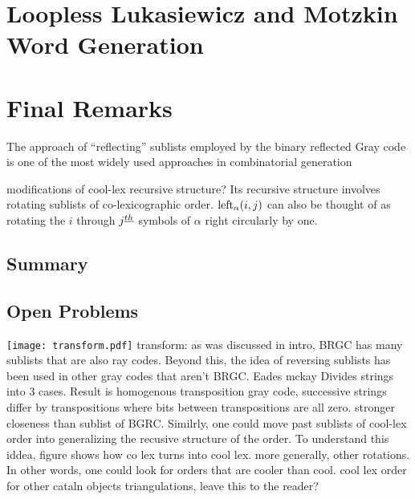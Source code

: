 \chapter{Loopless Lukasiewicz and Motzkin Word Generation} \label{chap:luka-implementation}


\chapter{Final Remarks}
The approach of “reflecting” sublists employed by the binary reflected Gray code is one of the most widely used approaches in combinatorial generation

modifications of cool-lex recursive structure?
Its recursive structure involves rotating sublists of co-lexicographic order.  
$\lshiftindex[\alpha]{i}{j}$ can also be thought of as rotating the $i$ through $j\thh$ symbols of $\alpha$ right circularly by one.
\section{Summary}
\section{Open Problems}
\texttt{[image: transform.pdf]}
transform: as was discussed in intro, BRGC has many sublists that are also ray codes.  Beyond this, the idea of reversing sublists has been used in other gray codes that aren't BRGC. Eades mckay Divides strings into 3 cases. Result is homogenous transposition gray code, successive strings differ by transpositions where bits between transpositions are all zero. stronger closeness than sublist of BGRC. Similrly, one could move past sublists of cool-lex order into generalizing the recusive structure of the order. To understand this iddea, figure shows how co lex turns into cool lex.  more generally, other rotations.  In other words, one could look for orders that are cooler than cool. 
cool lex order for other cataln objects
triangulations, leave this to the reader?





